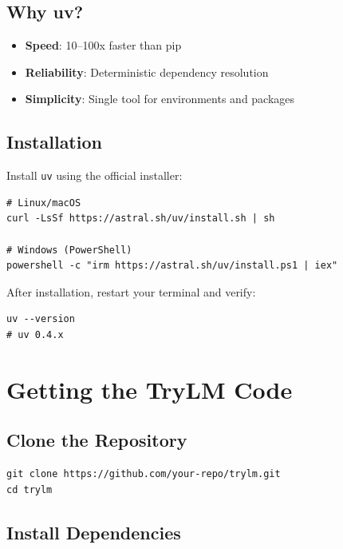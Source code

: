 \subsection{Why uv?}

\begin{itemize}
    \item \textbf{Speed}: 10--100x faster than pip
    \item \textbf{Reliability}: Deterministic dependency resolution
    \item \textbf{Simplicity}: Single tool for environments and packages
\end{itemize}

\subsection{Installation}

Install \texttt{uv} using the official installer:

\begin{lstlisting}[style=shell]
# Linux/macOS
curl -LsSf https://astral.sh/uv/install.sh | sh

# Windows (PowerShell)
powershell -c "irm https://astral.sh/uv/install.ps1 | iex"
\end{lstlisting}

After installation, restart your terminal and verify:

\begin{lstlisting}[style=shell]
uv --version
# uv 0.4.x
\end{lstlisting}

\section{Getting the TryLM Code}

\subsection{Clone the Repository}

\begin{lstlisting}[style=shell]
git clone https://github.com/your-repo/trylm.git
cd trylm
\end{lstlisting}

\subsection{Install Dependencies}

